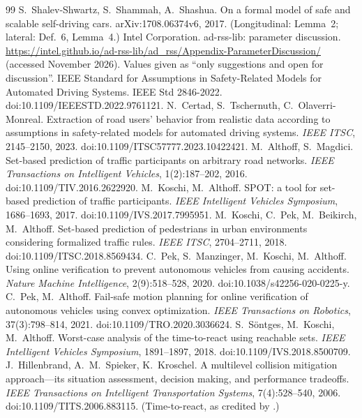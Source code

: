 \documentclass[11pt]{article}
\theoremstyle{definition}
\theoremstyle{remark}
\begin{document}
\begin{thebibliography}{99}\small
{} S.~Shalev-Shwartz, S.~Shammah, A.~Shashua. On a formal model of safe and scalable self-driving cars. arXiv:1708.06374v6, 2017. (Longitudinal: Lemma~2; lateral: Def.~6, Lemma~4.)
 Intel Corporation. ad-rss-lib: parameter discussion. \url{https://intel.github.io/ad-rss-lib/ad_rss/Appendix-ParameterDiscussion/} (accessed November 2026). Values given as ``only suggestions and open for discussion''.
 IEEE Standard for Assumptions in Safety-Related Models for Automated Driving Systems. IEEE Std 2846-2022. doi:10.1109/IEEESTD.2022.9761121.
 N.~Certad, S.~Tschernuth, C.~Olaverri-Monreal. Extraction of road users' behavior from realistic data according to assumptions in safety-related models for automated driving systems. \emph{IEEE ITSC}, 2145--2150, 2023. doi:10.1109/ITSC57777.2023.10422421.
 M.~Althoff, S.~Magdici. Set-based prediction of traffic participants on arbitrary road networks. \emph{IEEE Transactions on Intelligent Vehicles}, 1(2):187--202, 2016. doi:10.1109/TIV.2016.2622920.
 M.~Koschi, M.~Althoff. SPOT: a tool for set-based prediction of traffic participants. \emph{IEEE Intelligent Vehicles Symposium}, 1686--1693, 2017. doi:10.1109/IVS.2017.7995951.
 M.~Koschi, C.~Pek, M.~Beikirch, M.~Althoff. Set-based prediction of pedestrians in urban environments considering formalized traffic rules. \emph{IEEE ITSC}, 2704--2711, 2018. doi:10.1109/ITSC.2018.8569434.
 C.~Pek, S.~Manzinger, M.~Koschi, M.~Althoff. Using online verification to prevent autonomous vehicles from causing accidents. \emph{Nature Machine Intelligence}, 2(9):518--528, 2020. doi:10.1038/s42256-020-0225-y.
 C.~Pek, M.~Althoff. Fail-safe motion planning for online verification of autonomous vehicles using convex optimization. \emph{IEEE Transactions on Robotics}, 37(3):798--814, 2021. doi:10.1109/TRO.2020.3036624.
 S.~S\"ontges, M.~Koschi, M.~Althoff. Worst-case analysis of the time-to-react using reachable sets. \emph{IEEE Intelligent Vehicles Symposium}, 1891--1897, 2018. doi:10.1109/IVS.2018.8500709.
 J.~Hillenbrand, A.~M.~Spieker, K.~Kroschel. A multilevel collision mitigation approach---its situation assessment, decision making, and performance tradeoffs. \emph{IEEE Transactions on Intelligent Transportation Systems}, 7(4):528--540, 2006. doi:10.1109/TITS.2006.883115. (Time-to-react, as credited by \cite{sontges2018}.)

\end{thebibliography}
\end{document}
